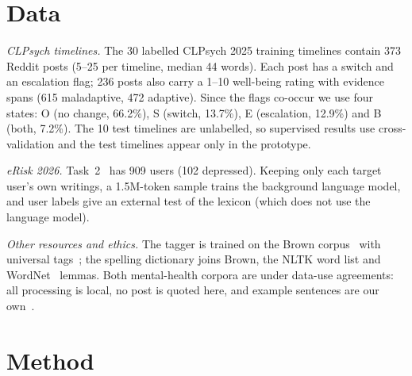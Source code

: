 \documentclass[conference]{IEEEtran}
\newcommand{\state}[1]{\textsc{#1}}
\begin{document}
\section{Data}

\emph{CLPsych timelines.} The 30 labelled CLPsych 2025 training timelines contain 373 Reddit posts (5--25 per timeline, median 44 words). Each post has a switch and an escalation flag; 236 posts also carry a 1--10 well-being rating with evidence spans (615 maladaptive, 472 adaptive). Since the flags co-occur we use four states: \state{O} (no change, 66.2\%), \state{S} (switch, 13.7\%), \state{E} (escalation, 12.9\%) and \state{B} (both, 7.2\%). The 10 test timelines are unlabelled, so supervised results use cross-validation and the test timelines appear only in the prototype.

\emph{eRisk 2026.} Task~2~\cite{erisk2026} has 909 users (102 depressed). Keeping only each target user's own writings, a 1.5M-token sample trains the background language model, and user labels give an external test of the lexicon (which does not use the language model).

\emph{Other resources and ethics.} The tagger is trained on the Brown corpus~\cite{francis1979brown} with universal tags~\cite{petrov2012universal}; the spelling dictionary joins Brown, the NLTK word list and WordNet~\cite{miller1995wordnet} lemmas. Both mental-health corpora are under data-use agreements: all processing is local, no post is quoted here, and example sentences are our own~\cite{benton2017ethical}.

\section{Method}
\end{document}
